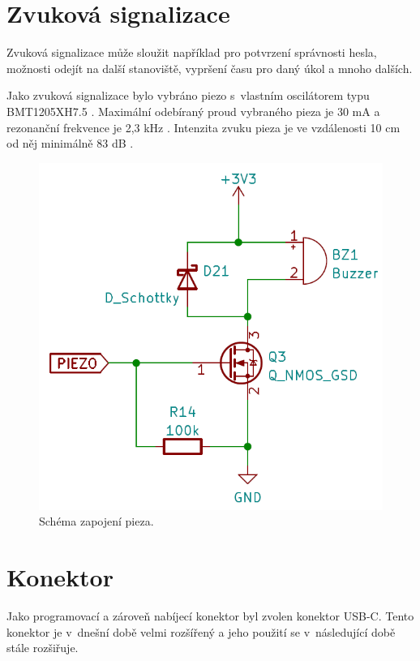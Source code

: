 \section{Zvuková signalizace}
Zvuková signalizace může sloužit například pro potvrzení správnosti hesla, možnosti odejít na další stanoviště, vypršení času pro daný úkol a mnoho dalších. 

Jako zvuková signalizace bylo vybráno piezo s~vlastním oscilátorem typu \\BMT1205XH7.5 \cite{piezo_dtsh}. Maximální odebíraný proud vybraného pieza je 30 mA a rezonanční frekvence 
je 2,3 kHz \cite{piezo_dtsh}. Intenzita zvuku pieza je ve vzdálenosti 10 cm od něj minimálně 83 dB \cite{piezo_dtsh}.

\begin{figure}[!h]
  \begin{center}
    \includegraphics[scale=0.45]{obrazky/piezo.png}
  \end{center}
  \caption[Schéma zapojení pieza]{Schéma zapojení pieza.}
\end{figure}

\section{Konektor}
Jako programovací a zároveň nabíjecí konektor byl zvolen konektor USB-C. Tento konektor je v~dnešní době velmi rozšířený a jeho použití se v~následující době stále rozšiřuje. 

